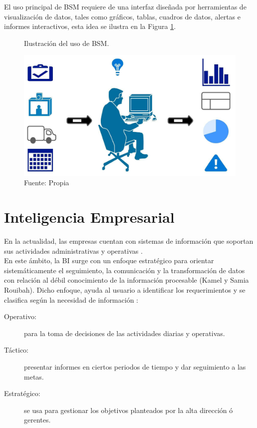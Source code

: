 \documentclass[12pt,jou]{apa7}
\begin{document}
El uso principal de BSM requiere de una interfaz diseñada por herramientas de visualización de datos, tales como gráficos, tablas, cuadros de datos, alertas e informes interactivos, esta idea se ilustra en la Figura \ref{fig: CMI}.

\begin{figure}[h]
\caption{Ilustración del uso de BSM.}
\centering
\includegraphics[width=0.77\linewidth]{Figuras/CMI}
\caption*{ Fuente: Propia}
\label{fig: CMI}
\end{figure} 

\section{Inteligencia Empresarial}
En la actualidad, las empresas cuentan con sistemas de información que soportan sus actividades administrativas y operativas \cite{MoralesL}.\\ 

En este ámbito, la BI surge con un enfoque estratégico para orientar sistemáticamente el seguimiento, la comunicación y la transformación de datos con relación al débil conocimiento de la información procesable (Kamel y Samia Rouibah). Dicho enfoque, ayuda al usuario a identificar los requerimientos y se clasifica según la necesidad de información \cite{egaf}:
\begin{description}
\item[Operativo:] para la toma de decisiones de las actividades diarias y operativas.
\item[Táctico:] presentar informes en ciertos periodos de tiempo y dar seguimiento a las metas.
\item[Estratégico:] se usa para gestionar los objetivos planteados por la alta dirección ó gerentes.
\end{description}
\def\pyramidwidth{0.7cm}
\def\pyramiddepth{0.5cm}
\def\pyramidheight{.35cm}
\def\levels{3}
\def\levelsep{0.04}
\end{document}
